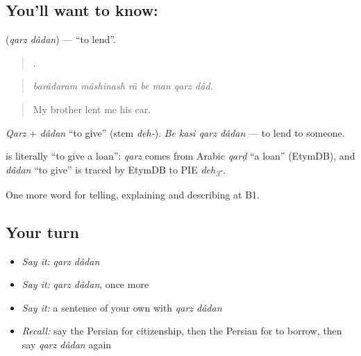 \subsection*{You'll want to know:  }
\textbf{ } (\emph{qarz dâdan}) — \textquotedblleft{}to lend\textquotedblright{}.

\begin{quote}
      .
\end{quote}

\begin{quote}
\emph{barâdaram mâshinash râ be man qarz dâd.}
\end{quote}

\begin{quote}
My brother lent me his car.
\end{quote}

\emph{Qarz} + \emph{dâdan} \textquotedblleft{}to give\textquotedblright{} (stem \emph{deh-}). \emph{Be kasi qarz dâdan} — to lend to someone.

\begin{cousinweb}
\textbf{ } is literally \textquotedblleft{}to give a loan\textquotedblright{}: \emph{qarz} comes from Arabic \emph{qarḍ} \textquotedblleft{}a loan\textquotedblright{} (EtymDB), and \emph{dâdan} \textquotedblleft{}to give\textquotedblright{} is traced by EtymDB to PIE \emph{deh\textsubscript{3}-}.
\end{cousinweb}

\begin{grammarlens}[title={What you've built}]
One more word for telling, explaining and describing at B1.
\end{grammarlens}

\subsection*{Your turn}
\begin{itemize}
\raggedright
  \item \emph{Say it:} \emph{qarz dâdan}
  \item \emph{Say it:} \emph{qarz dâdan}, once more
  \item \emph{Say it:} a sentence of your own with \emph{qarz dâdan}
  \item \emph{Recall:} say the Persian for citizenship, then the Persian for to borrow, then say \emph{qarz dâdan} again
\end{itemize}

